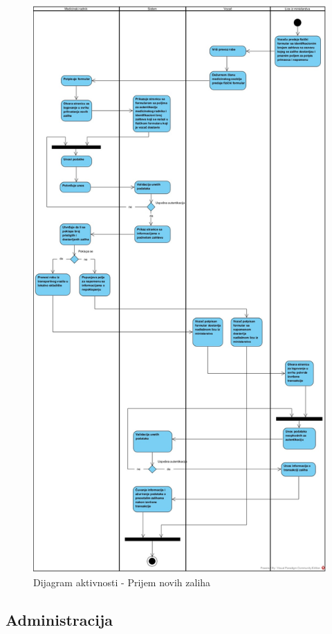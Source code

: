\documentclass[titlepage]{article}
\begin{document}
\begin{figure}[H]
\centering
\includegraphics[scale=0.3]{Prijem_novih_zaliha}
\caption{Dijagram aktivnosti -  Prijem novih zaliha}
\end{figure}


\subsection{Administracija}
\end{document}
